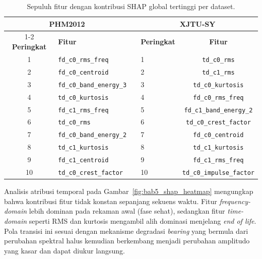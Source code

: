 \begin{table}[ht]
  \centering
  \caption{Sepuluh fitur dengan kontribusi SHAP global tertinggi per dataset.}
  \label{tab:bab5_shap_top10}
  \small
  \begin{tabular}{@{}clclc@{}}
    \toprule
    \multicolumn{2}{c}{\textbf{PHM2012}} & & \multicolumn{2}{c}{\textbf{XJTU-SY}} \\
    \cmidrule{1-2}\cmidrule{4-5}
    \textbf{Peringkat} & \textbf{Fitur} & & \textbf{Peringkat} & \textbf{Fitur} \\
    \midrule
    1 & \texttt{fd\_c0\_rms\_freq}      & & 1 & \texttt{td\_c0\_rms} \\
    2 & \texttt{fd\_c0\_centroid}       & & 2 & \texttt{td\_c1\_rms} \\
    3 & \texttt{fd\_c0\_band\_energy\_3} & & 3 & \texttt{td\_c0\_kurtosis} \\
    4 & \texttt{td\_c0\_kurtosis}       & & 4 & \texttt{fd\_c0\_rms\_freq} \\
    5 & \texttt{fd\_c1\_rms\_freq}      & & 5 & \texttt{fd\_c1\_band\_energy\_2} \\
    6 & \texttt{td\_c0\_rms}            & & 6 & \texttt{td\_c0\_crest\_factor} \\
    7 & \texttt{fd\_c0\_band\_energy\_2} & & 7 & \texttt{fd\_c0\_centroid} \\
    8 & \texttt{td\_c1\_kurtosis}       & & 8 & \texttt{td\_c1\_kurtosis} \\
    9 & \texttt{fd\_c1\_centroid}       & & 9 & \texttt{fd\_c1\_rms\_freq} \\
    10 & \texttt{td\_c0\_crest\_factor} & & 10 & \texttt{td\_c0\_impulse\_factor} \\
    \bottomrule
  \end{tabular}

  \smallskip
  \footnotesize
\end{table}

Analisis atribusi temporal pada Gambar~\ref{fig:bab5_shap_heatmap}
mengungkap bahwa kontribusi fitur tidak konstan sepanjang sekuens waktu.
Fitur \emph{frequency-domain} lebih dominan pada rekaman awal (fase sehat),
sedangkan fitur \emph{time-domain} seperti RMS dan kurtosis mengambil alih
dominasi menjelang \emph{end of life}. Pola transisi ini sesuai dengan
mekanisme degradasi \emph{bearing} yang bermula dari perubahan spektral halus
kemudian berkembang menjadi perubahan amplitudo yang kasar dan dapat diukur
langsung.

